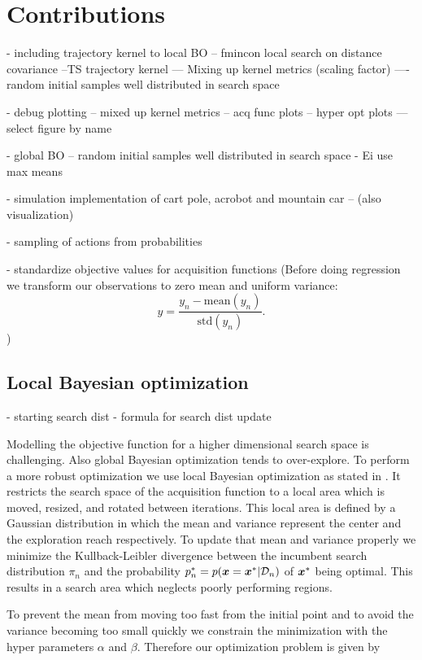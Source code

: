 \chapter{Contributions}
\label{chap:contributions}

- including trajectory kernel to local BO
-- fmincon local search on distance covariance
--TS trajectory kernel
--- Mixing up kernel metrics (scaling factor)
---- random initial samples well distributed in search space

- debug plotting
-- mixed up kernel metrics
-- acq func plots
-- hyper opt plots
--- select figure by name

- global BO
-- random initial samples well distributed in search space
- Ei use max means

- simulation implementation of cart pole, acrobot and mountain car
-- (also visualization)

- sampling of actions from probabilities

- standardize objective values for acquisition functions
(Before doing regression we transform our observations to zero mean and uniform variance:
$$y = \frac{y_{n}-\mathrm{mean}(y_{n})}{\mathrm{std}(y_{n})}.$$)


\section{Local Bayesian optimization}

- starting search dist
- formula for search dist update

Modelling the objective function for a higher dimensional search space is challenging. Also global Bayesian optimization tends to over-explore. To perform a more robust optimization we use local Bayesian optimization as stated in \cite{akrour2017local}. It restricts the search space of the acquisition function to a local area which is moved, resized, and rotated between iterations. This local area is defined by a Gaussian distribution in which the mean and variance represent the center and the exploration reach respectively. To update that mean and variance properly we minimize the Kullback-Leibler divergence between the incumbent search distribution $\pi_n$ and the probability $p_n^* = p({\boldsymbol{x}}={\boldsymbol{x}}^*|\mathcal{D}_n)$ of ${\boldsymbol{x}}^*$ being optimal. This results in a search area which neglects poorly performing regions.

To prevent the mean from moving too fast from the initial point and to avoid the variance becoming too small quickly we constrain the minimization with the hyper parameters $\alpha$ and $\beta$. Therefore our optimization problem is given by

